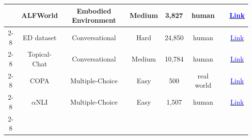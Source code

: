 \begin{table}[!htp]
{\begin{tabular}{c|c|c|c|c|c|c|c}
                                                                                  & ALFWorld               & Embodied Environment    & Medium              & 3,827            & human               & \cite{wu2023autogen}                                                                                                                                                            & \href{https://github.com/alfworld/alfworld/tree/master/alfworld/data}{\textcolor{blue}{Link}}                                                                     \\ \cline{2-8}
                                                                                  & ED dataset             & Conversational          & Hard                & 24,850           & human               & \cite{zhang2024self}                                                                                                                                                            & \href{https://github.com/facebookresearch/EmpatheticDialogues}{\textcolor{blue}{Link}}                                                                            \\ \cline{2-8}
                                                                                  & Topical-Chat           & Conversational          & Medium              & 10,784           & human               & \cite{chan2023chateval}                                                                                                                                                         & \href{https://github.com/alexa/Topical-Chat}{\textcolor{blue}{Link}}                                                                                              \\ \cline{2-8}
                                                                                  & COPA                   & Multiple-Choice         & Easy                & 500              & real world          & \cite{xiong2023examining}                                                                                                                                                       & \href{http://www.ict.usc.edu/~gordon/copa.html}{\textcolor{blue}{Link}}                                                                                           \\ \cline{2-8}
                                                                                  & $\alpha$NLI            & Multiple-Choice         & Easy                & 1,507            & human               & \cite{xiong2023examining}                                                                                                                                                       & \href{http://abductivecommonsense.xyz}{\textcolor{blue}{Link}}                                                                                                    \\ \cline{2-8}

\end{tabular}}
\end{table}
